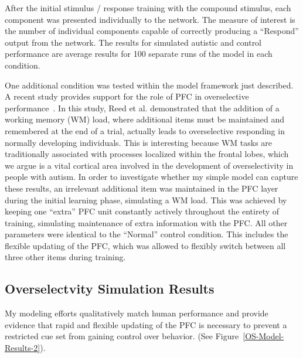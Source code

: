 After the initial stimulus / response training with the compound stimulus, each component was presented individually to the network.  The measure of interest is the number of individual components capable of correctly producing a ``Respond'' output from the network.  The results for simulated autistic and control performance are average results for 100 separate runs of the model in each condition.

One additional condition was tested within the model framework just described.  A recent study provides support for the role of PFC in overselective performance~\cite{RefWorks:112}.  In this study, Reed et al. demonstrated that the addition of a working memory (WM) load, where additional items must be maintained and remembered at the end of a trial, actually leads to overselective responding in normally developing individuals.  This is interesting because WM tasks are traditionally associated with processes localized within the frontal lobes, which we argue is a vital cortical area involved in the development of overselectivity in people with autism.  In order to investigate whether my simple model can capture these results, an irrelevant additional item was maintained in the PFC layer during the initial learning phase, simulating a WM load.  This was achieved by keeping one ``extra'' PFC unit constantly actively throughout the entirety of training, simulating maintenance of extra information with the PFC.  All other parameters were identical to the ``Normal'' control condition.  This includes the flexible updating of the PFC, which  was allowed to flexibly switch between all three other items during training.

\subsection{Overselectvity Simulation Results}
My modeling efforts qualitatively match human performance and provide evidence that rapid and flexible updating of the PFC is necessary to prevent a restricted cue set from gaining control over behavior. (See Figure~\ref{OS-Model-Results-2}).  

